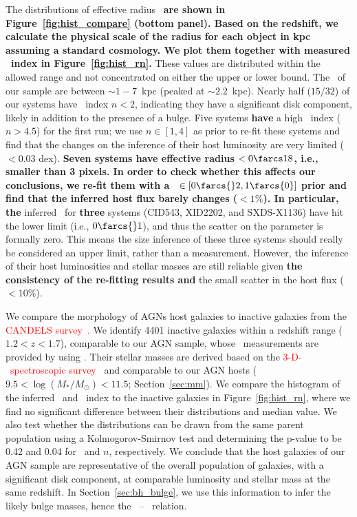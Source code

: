 \documentclass[apj]{emulateapj}
\begin{document}
The distributions of effective radius \Reff\ {\bf are shown in Figure~\ref{fig:hist_compare} {\bf (bottom panel)}. Based on the redshift, we calculate the physical scale of the radius for each object in kpc assuming a standard cosmology. We plot them together with measured \sersic\ index in Figure~\ref{fig:hist_rn}.} These values are distributed within the allowed range and not concentrated on either the upper or lower bound. The \Reff\ of our sample are between $\sim1-7$~kpc (peaked at $\sim2.2$~kpc). Nearly half ($15/32$) of our systems have \sersic\ index $n<2$, indicating they have a significant disk component, likely in addition to the presence of a bulge. Five systems {\bf have} a high \sersic\ index ($n>4.5$) for the first run; we use $n\in[1,4]$ as prior to re-fit these systems and find that the changes on the inference of their host luminosity are very limited ($<0.03$ dex). 
{\bf Seven systems have effective radius \Reff$<0\farcs18$, i.e., smaller than 3 pixels. In order to check whether this affects our conclusions,  we re-fit them with a \Reff\ $\in[0\farcs{}2,1\farcs{0}]$ prior and find that the inferred host flux barely changes ($<1\%$). In particular, the}
inferred \Reff\ for {\bf three} systems (CID543, XID2202, and SXDS-X1136) have hit the lower limit (i.e., $0\farcs{}1$), and thus the scatter on the parameter is formally zero. This means the size inference of these three systems should really be considered an upper limit, rather than a measurement. However, the inference of their host luminosities and stellar masses are still reliable given {\bf the consistency of the re-fitting results and} the small scatter in the host flux ($<10\%$).

We compare the morphology of AGNs host galaxies to inactive galaxies from the \textcolor{red}{CANDELS survey~\citep{Grogin2011, Koekemoer2011}.} We identify 4401 inactive galaxies within a redshift range ($1.2<z<1.7$), comparable to our AGN sample, whose \sersic\ measurements are provided by \citet{VDwel++2012} using \galfit. Their stellar masses are derived based on the \textcolor{red}{3-D-\hst\ spectroscopic survey}~\citep{Momcheva2016, Brammer2012} and comparable to our AGN hosts ($9.5< \log (M_* /M_{\odot})< 11.5$; Section~\ref{sec:mm}). We compare the histogram of the inferred \Reff\ and \sersic\ index to the inactive galaxies in Figure~\ref{fig:hist_rn}, where we find no significant difference between their distributions and median value. We also test whether the distributions can be drawn from the same parent population using a Kolmogorov-Smirnov test and determining the p-value to be 0.42 and 0.04 for \Reff\ and $n$, respectively. We conclude that the host galaxies of our AGN sample are representative of the overall population of galaxies, with a significant disk component, at comparable luminosity and stellar mass at the same redshift. In Section~\ref{sec:bh_bulge}, we use this information to infer the likely bulge masses, hence the \mbh\ -- \bmass\ relation.
\end{document}
